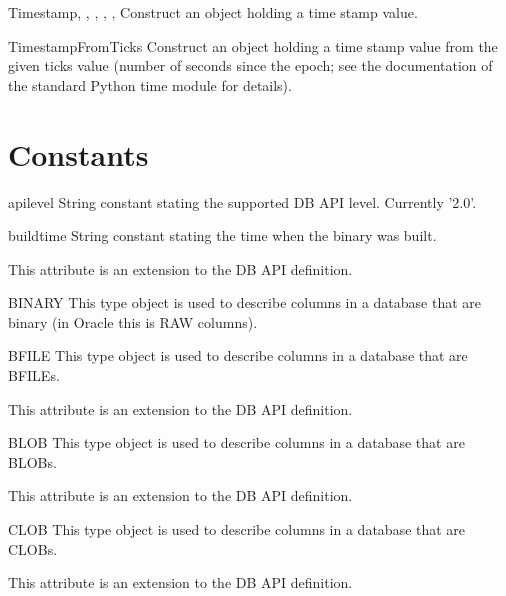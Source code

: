 \documentclass{manual}
\begin{document}
\begin{funcdesc}{Timestamp}{, , ,
    , , }
  Construct an object holding a time stamp value.
\end{funcdesc}

\begin{funcdesc}{TimestampFromTicks}{}
  Construct an object holding a time stamp value from the given ticks value
  (number of seconds since the epoch; see the documentation of the standard
  Python time module for details).
\end{funcdesc}

\section{Constants}

\begin{datadesc}{apilevel}
  String constant stating the supported DB API level. Currently '2.0'.
\end{datadesc}

\begin{datadesc}{buildtime}
  String constant stating the time when the binary was built.

   This attribute is an extension to the DB API definition.
\end{datadesc}

\begin{datadesc}{BINARY}
  This type object is used to describe columns in a database that are binary
  (in Oracle this is RAW columns).
\end{datadesc}

\begin{datadesc}{BFILE}
  This type object is used to describe columns in a database that are BFILEs.

   This attribute is an extension to the DB API definition.
\end{datadesc}

\begin{datadesc}{BLOB}
  This type object is used to describe columns in a database that are BLOBs.

   This attribute is an extension to the DB API definition.
\end{datadesc}

\begin{datadesc}{CLOB}
  This type object is used to describe columns in a database that are CLOBs.

   This attribute is an extension to the DB API definition.
\end{datadesc}
\end{document}
